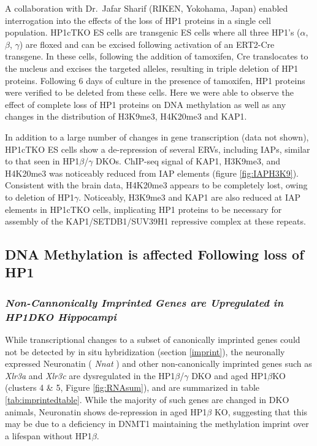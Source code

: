 \documentclass[onehalf,12pt]{beavtex}
\begin{document}
  A collaboration with Dr.~Jafar Sharif (RIKEN, Yokohama, Japan) enabled
  interrogation into the effects of the loss of HP1 proteins in a single
  cell population. HP1cTKO ES cells are transgenic ES cells where all
  three HP1's (\(\alpha\), \(\beta\), \(\gamma\)) are floxed and can be
  excised following activation of an ERT2-Cre transgene. In these cells,
  following the addition of tamoxifen, Cre translocates to the nucleus and
  excises the targeted alleles, resulting in triple deletion of HP1
  proteins. Following 6 days of culture in the presence of tamoxifen, HP1
  proteins were verified to be deleted from these cells. Here we were able
  to observe the effect of complete loss of HP1 proteins on DNA
  methylation as well as any changes in the distribution of H3K9me3,
  H4K20me3 and KAP1.
  
  In addition to a large number of changes in gene transcription (data not
  shown), HP1cTKO ES cells show a de-repression of several ERVs, including
  IAPs, similar to that seen in HP1\(\beta\)/\(\gamma\) DKOs. ChIP-seq
  signal of KAP1, H3K9me3, and H4K20me3 was noticeably reduced from IAP
  elements (figure \ref{fig:IAPH3K9}). Consistent with the brain data,
  H4K20me3 appears to be completely lost, owing to deletion of
  HP1\(\gamma\). Noticeably, H3K9me3 and KAP1 are also reduced at IAP
  elements in HP1cTKO cells, implicating HP1 proteins to be necessary for
  assembly of the KAP1/SETDB1/SUV39H1 repressive complex at these repeats.
  
  \subsection{DNA Methylation is affected Following loss of
  HP1}\label{dna-methylation-is-affected-following-loss-of-hp1}
  
  \subsubsection*{\texorpdfstring{\emph{Non-Cannonically Imprinted Genes
  are Upregulated in HP1DKO
  Hippocampi}}{Non-Cannonically Imprinted Genes are Upregulated in HP1DKO Hippocampi}}\label{non-cannonically-imprinted-genes-are-upregulated-in-hp1dko-hippocampi}
  
  While transcriptional changes to a subset of canonically imprinted genes
  could not be detected by in situ hybridization (section \ref{imprint}),
  the neuronally expressed Neuronatin ( \emph{Nnat} ) and other
  non-canonically imprinted genes such as \emph{Xlr3a} and \emph{Xlr3c}
  are dysregulated in the HP1\(\beta\)/\(\gamma\) DKO and aged
  HP1\(\beta\)KO (clusters 4 \& 5, Figure \ref{fig:RNAsum}), and are
  summarized in table \ref{tab:imprintedtable}. While the majority of such
  genes are changed in DKO animals, Neuronatin shows de-repression in aged
  HP1\(\beta\) KO, suggesting that this may be due to a deficiency in
  DNMT1 maintaining the methylation imprint over a lifespan without
  HP1\(\beta\).
  
\end{document}
